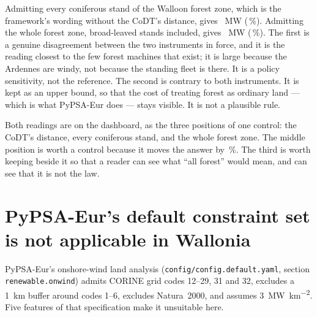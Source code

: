 \documentclass[11pt,a4paper]{article}
\begin{document}
Admitting every coniferous stand of the Walloon forest zone, which is the
framework's wording without the CoDT's distance, gives \SensForestConifMW{}~MW
(\SensForestConifPct{}\,\%). Admitting the whole forest zone, broad-leaved
stands included, gives \SensForestAllMW{}~MW (\SensForestAllPct{}\,\%). The
first is a genuine disagreement between the two instruments in force, and it is
the reading closest to the few forest machines that exist; it is large because
the Ardennes are windy, not because the standing fleet is there. It is a policy
sensitivity, not the reference. The second is contrary to both instruments. It
is kept as an upper bound, so that the cost of treating forest as ordinary
land --- which is what PyPSA-Eur does --- stays visible. It is not a plausible
rule.

Both readings are on the dashboard, as the three positions of one control: the
CoDT's distance, every coniferous stand, and the whole forest zone. The middle
position is worth a control because it moves the answer by
\SensForestConifPct{}\,\%. The third is worth keeping beside it so that a reader
can see what ``all forest'' would mean, and can see that it is not the law.

\section{PyPSA-Eur's default constraint set is not applicable in Wallonia}
\label{sec:pypsaeur}

PyPSA-Eur's onshore-wind land analysis (\texttt{config/config.default.yaml},
section \texttt{renewable.onwind}) admits CORINE grid codes 12--29, 31 and 32,
excludes a \SI{1}{\kilo\metre} buffer around codes 1--6, excludes Natura~2000,
and assumes \SI{3}{\mega\watt\per\square\kilo\metre}. Five features of that
specification make it unsuitable here.
\end{document}
